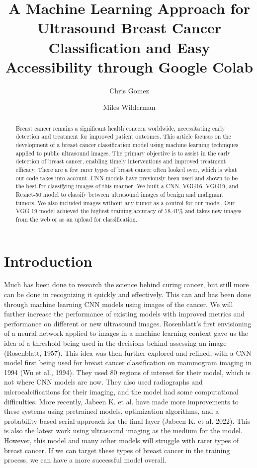 \documentclass{article}
\title{A Machine Learning Approach for Ultrasound Breast Cancer Classification and Easy Accessibility through Google Colab}
\author{Chris Gomez \and Miles Wilderman}
\begin{document}
\maketitle

\begin{abstract}
Breast cancer remains a significant health concern worldwide, necessitating early detection and treatment for improved patient outcomes. This article focuses on the development of a breast cancer classification model using machine learning techniques applied to public ultrasound images. The primary objective is to assist in the early detection of breast cancer, enabling timely interventions and improved treatment efficacy. There are a few rarer types of breast cancer often looked over, which is what our code takes into account. CNN models have previously been used and shown to be the best for classifying images of this manner. We built a CNN, VGG16, VGG19, and Resnet-50 model to classify between ultrasound images of benign and malignant tumors. We also included images without any tumor as a control for our model. Our VGG 19 model achieved the highest training accuracy of 78.41\% and takes new images from the web or as an upload for classification. 
\end{abstract}

\section{Introduction}
Much has been done to research the science behind curing cancer, but still more can be done in recognizing it quickly and effectively. This can and has been done through machine learning CNN models using images of the cancer. We will further increase the performance of existing models with improved metrics and performance on different or new ultrasound images. Rosenblatt’s first envisioning of a neural network applied to images in a machine learning context gave us the idea of a threshold being used in the decisions behind assessing an image (Rosenblatt, 1957). This idea was then further explored and refined, with a CNN model first being used for breast cancer classification on mammogram imaging in 1994 (Wu et al., 1994). They used 80 regions of interest for their model, which is not where CNN models are now. They also used radiographs and microcalcifications for their imaging, and the model had some computational difficulties. More recently, Jabeen K. et al. have made more improvements to these systems using pretrained models, optimization algorithms, and a probability-based serial approach for the final layer (Jabeen K. et al. 2022). This is also the latest work using ultrasound imaging as the medium for the model. However, this model and many other models will struggle with rarer types of breast cancer. If we can target these types of breast cancer in the training process, we can have a more successful model overall.
\end{document}
